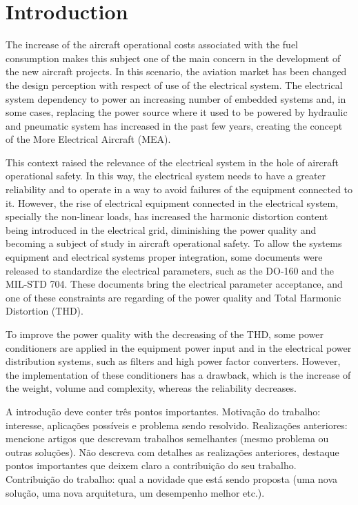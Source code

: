 \section{Introduction}

The increase of the aircraft operational costs associated with the fuel consumption makes this subject one of the main concern in the development of the new aircraft projects. In this scenario, the aviation market has been changed the design perception with respect of use of the electrical system. The electrical system dependency to power an increasing number of embedded systems and, in some cases, replacing the power source where it used to be powered by hydraulic and pneumatic system has increased in the past few years, creating the concept of the More Electrical Aircraft (MEA).

This context raised the relevance of the electrical system in the hole of aircraft operational safety. In this way, the electrical system needs to have a greater reliability and to operate in a way to avoid failures of the equipment connected to it. However, the rise of electrical equipment connected in the electrical system, specially the non-linear loads, has increased the harmonic distortion content being introduced in the electrical grid, diminishing the power quality and becoming a subject of study in aircraft operational safety. To allow the systems equipment and electrical systems proper integration, some documents were released to standardize the electrical parameters, such as the DO-160 and the MIL-STD 704. These documents bring the electrical parameter acceptance, and one of these constraints are regarding of the power quality and Total Harmonic Distortion (THD). 

To improve the power quality with the decreasing of the THD, some power conditioners are applied in the equipment power input and in the electrical power distribution systems, such as filters and high power factor converters. However, the implementation of these conditioners has a drawback, which is the increase of the weight, volume and complexity, whereas the reliability decreases.


A introdução deve conter três pontos importantes. 
Motivação do trabalho: interesse, aplicações possíveis e problema sendo resolvido. 
Realizações anteriores: mencione artigos que descrevam trabalhos semelhantes (mesmo problema ou outras soluções). Não descreva com detalhes as realizações anteriores, destaque pontos importantes que deixem claro a contribuição do seu trabalho. 
Contribuição do trabalho: qual a novidade que está sendo proposta (uma nova solução, uma nova arquitetura, um desempenho melhor etc.).



%
%

